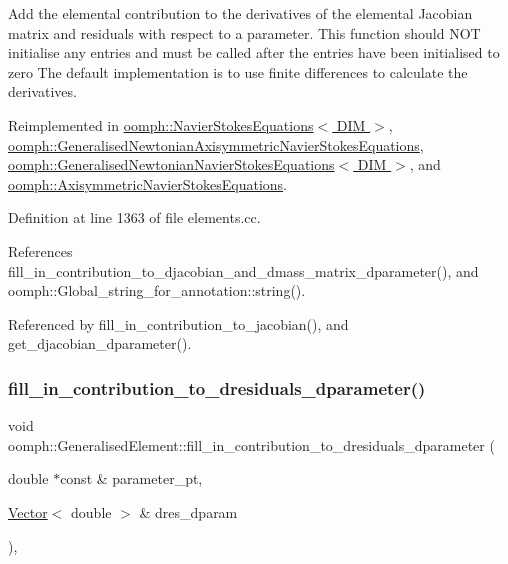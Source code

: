 Add the elemental contribution to the derivatives of the elemental Jacobian matrix and residuals with respect to a parameter. This function should N\+OT initialise any entries and must be called after the entries have been initialised to zero The default implementation is to use finite differences to calculate the derivatives. 

Reimplemented in \hyperlink{classoomph_1_1NavierStokesEquations_a93c137baa292eea6159ea74fc667f7de}{oomph\+::\+Navier\+Stokes\+Equations$<$ D\+I\+M $>$}, \hyperlink{classoomph_1_1GeneralisedNewtonianAxisymmetricNavierStokesEquations_a0b1b64308af0b8f6d5cd553e6f471413}{oomph\+::\+Generalised\+Newtonian\+Axisymmetric\+Navier\+Stokes\+Equations}, \hyperlink{classoomph_1_1GeneralisedNewtonianNavierStokesEquations_a8b9b51442b6209405de77a0edca19c9b}{oomph\+::\+Generalised\+Newtonian\+Navier\+Stokes\+Equations$<$ D\+I\+M $>$}, and \hyperlink{classoomph_1_1AxisymmetricNavierStokesEquations_ad8ac18903e3e4e63301bfe67d5e08361}{oomph\+::\+Axisymmetric\+Navier\+Stokes\+Equations}.



Definition at line 1363 of file elements.\+cc.



References fill\+\_\+in\+\_\+contribution\+\_\+to\+\_\+djacobian\+\_\+and\+\_\+dmass\+\_\+matrix\+\_\+dparameter(), and oomph\+::\+Global\+\_\+string\+\_\+for\+\_\+annotation\+::string().



Referenced by fill\+\_\+in\+\_\+contribution\+\_\+to\+\_\+jacobian(), and get\+\_\+djacobian\+\_\+dparameter().

\mbox{\label{classoomph_1_1GeneralisedElement_a64d31806fcbe7c5b689a3281932e8073}} 
\subsubsection{\texorpdfstring{fill\+\_\+in\+\_\+contribution\+\_\+to\+\_\+dresiduals\+\_\+dparameter()}{fill\_in\_contribution\_to\_dresiduals\_dparameter()}}
{\footnotesize\ttfamily void oomph\+::\+Generalised\+Element\+::fill\+\_\+in\+\_\+contribution\+\_\+to\+\_\+dresiduals\+\_\+dparameter (\begin{DoxyParamCaption}\item[{double $\ast$const \&}]{parameter\+\_\+pt,  }\item[{\hyperlink{classoomph_1_1Vector}{Vector}$<$ double $>$ \&}]{dres\+\_\+dparam }\end{DoxyParamCaption})\hspace{0.3cm}{\ttfamily [protected]}, {\ttfamily [virtual]}}



